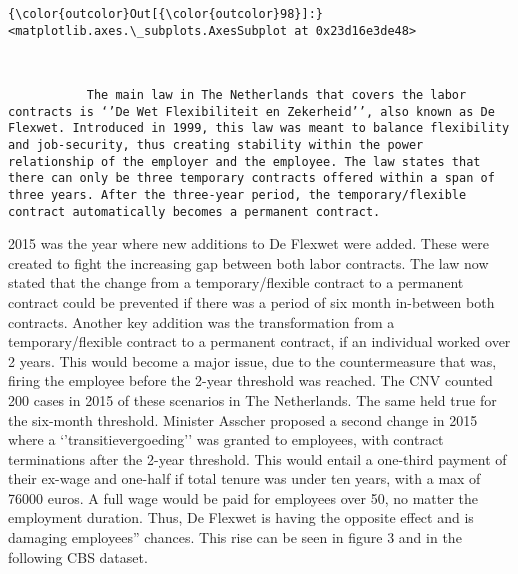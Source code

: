 \documentclass[11pt]{article}
\begin{document}
            \begin{Verbatim}[commandchars=\\\{\}]
{\color{outcolor}Out[{\color{outcolor}98}]:} <matplotlib.axes.\_subplots.AxesSubplot at 0x23d16e3de48>
\end{Verbatim}
        
    \begin{center}
    \end{center}
    { \hspace*{\fill} \\}
    
    \begin{verbatim}
           The main law in The Netherlands that covers the labor contracts is ‘’De Wet Flexibiliteit en Zekerheid’’, also known as De Flexwet. Introduced in 1999, this law was meant to balance flexibility and job-security, thus creating stability within the power relationship of the employer and the employee. The law states that there can only be three temporary contracts offered within a span of three years. After the three-year period, the temporary/flexible contract automatically becomes a permanent contract.
\end{verbatim}

2015 was the year where new additions to De Flexwet were added. These
were created to fight the increasing gap between both labor contracts.
The law now stated that the change from a temporary/flexible contract to
a permanent contract could be prevented if there was a period of six
month in-between both contracts. Another key addition was the
transformation from a temporary/flexible contract to a permanent
contract, if an individual worked over 2 years. This would become a
major issue, due to the countermeasure that was, firing the employee
before the 2-year threshold was reached. The CNV counted 200 cases in
2015 of these scenarios in The Netherlands. The same held true for the
six-month threshold. Minister Asscher proposed a second change in 2015
where a `'transitievergoeding'' was granted to employees, with contract
terminations after the 2-year threshold. This would entail a one-third
payment of their ex-wage and one-half if total tenure was under ten
years, with a max of 76000 euros. A full wage would be paid for
employees over 50, no matter the employment duration. Thus, De Flexwet
is having the opposite effect and is damaging employees'' chances. This
rise can be seen in figure 3 and in the following CBS dataset.
\end{document}
